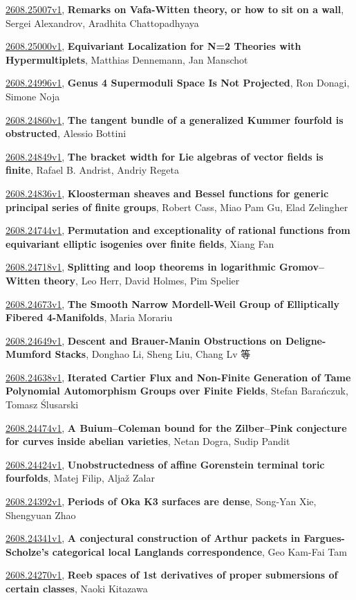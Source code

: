 \documentclass[9pt, a4paper]{article}
\theoremstyle{plain}
\theoremstyle{definition}
\theoremstyle{remark}
\newcommand{\arxiv}[3]{\href{https://arxiv.org/abs/#1}{#1}, \textbf{\textcolor{arxivblue}{#2}}, #3}
\begin{document}
\arxiv{2608.25007v1}{Remarks on Vafa-Witten theory, or how to sit on a wall}{Sergei Alexandrov, Aradhita Chattopadhyaya}

\arxiv{2608.25000v1}{Equivariant Localization for N=2 Theories with Hypermultiplets}{Matthias Dennemann, Jan Manschot}

\arxiv{2608.24996v1}{Genus 4 Supermoduli Space Is Not Projected}{Ron Donagi, Simone Noja}

\arxiv{2608.24860v1}{The tangent bundle of a generalized Kummer fourfold is obstructed}{Alessio Bottini}

\arxiv{2608.24849v1}{The bracket width for Lie algebras of vector fields is finite}{Rafael B. Andrist, Andriy Regeta}

\arxiv{2608.24836v1}{Kloosterman sheaves and Bessel functions for generic principal series of finite groups}{Robert Cass, Miao Pam Gu, Elad Zelingher}

\arxiv{2608.24744v1}{Permutation and exceptionality of rational functions from equivariant elliptic isogenies over finite fields}{Xiang Fan}

\arxiv{2608.24718v1}{Splitting and loop theorems in logarithmic Gromov--Witten theory}{Leo Herr, David Holmes, Pim Spelier}

\arxiv{2608.24673v1}{The Smooth Narrow Mordell-Weil Group of Elliptically Fibered 4-Manifolds}{Maria Morariu}

\arxiv{2608.24649v1}{Descent and Brauer-Manin Obstructions on Deligne-Mumford Stacks}{Donghao Li, Sheng Liu, Chang Lv 等}

\arxiv{2608.24638v1}{Iterated Cartier Flux and Non-Finite Generation of Tame Polynomial Automorphism Groups over Finite Fields}{Stefan Barańczuk, Tomasz Ślusarski}

\arxiv{2608.24474v1}{A Buium--Coleman bound for the Zilber--Pink conjecture for curves inside abelian varieties}{Netan Dogra, Sudip Pandit}

\arxiv{2608.24424v1}{Unobstructedness of affine Gorenstein terminal toric fourfolds}{Matej Filip, Aljaž Zalar}

\arxiv{2608.24392v1}{Periods of Oka K3 surfaces are dense}{Song-Yan Xie, Shengyuan Zhao}

\arxiv{2608.24341v1}{A conjectural construction of Arthur packets in Fargues-Scholze's categorical local Langlands correspondence}{Geo Kam-Fai Tam}

\arxiv{2608.24270v1}{Reeb spaces of 1st derivatives of proper submersions of certain classes}{Naoki Kitazawa}
\end{document}
